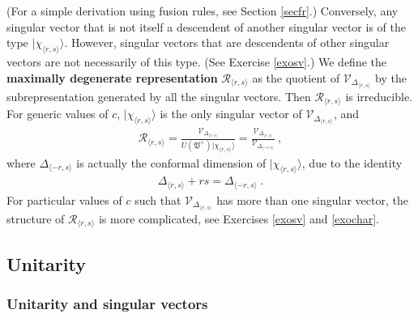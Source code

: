 \documentclass[12pt, a4paper, notitlepage, twoside]{report}
\numberwithin{equation}{section}
\theoremstyle{break}
\begin{document}
(For a simple derivation using fusion rules, see Section \ref{secfr}.)
Conversely, any singular vector that is not itself a descendent of another singular vector is of the type $|\chi_{\langle r,s \rangle}\rangle$.
However, singular vectors that are descendents of other singular vectors are not necessarily of this type. (See 
Exercise \ref{exosv}.) We define the \textbf{\boldmath maximally degenerate representation} $\mathcal{R}_{\langle r,s \rangle}$ as the quotient of $\mathcal{V}_{\Delta_{\langle r,s \rangle}}$ by the subrepresentation generated by all the singular vectors. 
Then $\mathcal{R}_{\langle r,s \rangle}$ is irreducible.
For generic values of $c$, $|\chi_{\langle r,s \rangle}\rangle$ is the only singular vector of $\mathcal{V}_{\Delta_{\langle r,s \rangle}}$, and 
\begin{align}
 \mathcal{R}_{\langle r,s\rangle} =\frac{\mathcal{V}_{\Delta_{\langle r,s \rangle}}}{U(\mathfrak{V}^+) |\chi_{\langle r,s \rangle}\rangle }
= \frac{\mathcal{V}_{\Delta_{\langle r,s \rangle}}}{\mathcal{V}_{\Delta_{\langle -r,s \rangle}} }\ ,
\end{align}
where $\Delta_{\langle -r,s \rangle}$ is actually the conformal dimension of $|\chi_{\langle r,s \rangle}\rangle$, due to the identity
\begin{align}
 \Delta_{\langle r,s \rangle} + rs = \Delta_{\langle -r,s \rangle}\ .
\label{dmr}
\end{align}
For particular values of $c$ such that $\mathcal{V}_{\Delta_{\langle r,s \rangle}}$ has more than one singular vector, the structure of $ \mathcal{R}_{\langle r,s\rangle}$ is more complicated, see Exercises \ref{exosv} and \ref{exochar}.



\subsection{Unitarity}\label{secuni}

\subsubsection{Unitarity and singular vectors}
\end{document}

